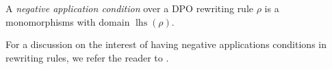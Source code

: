\begin{definition}
    \label{def:grs:dpo_nac}
    A \textit{negative application condition} over a DPO rewriting rule $\rho$ is a monomorphisms with domain $\operatorname{lhs}(\rho)$.
\end{definition}
For a discussion on the interest of having negative applications conditions in rewriting rules, we refer the reader to \cite[.1]{ehrig1997algebraic}.
